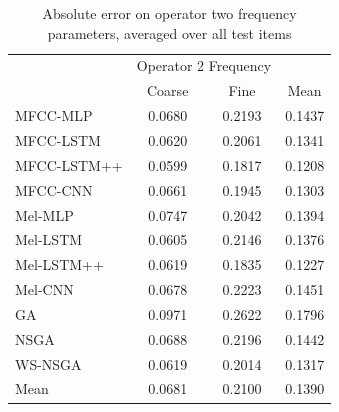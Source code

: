 \begin{table}[ht]
\centering
\begin{tabular}{l|cc|c}
\toprule
{} & \multicolumn{2}{c}{Operator 2 Frequency} & {} \\
{} & Coarse & Fine & Mean \\
\midrule
MFCC-MLP    &    0.0680 &  0.2193 & 0.1437 \\
MFCC-LSTM   &    0.0620 &  0.2061 & 0.1341 \\
MFCC-LSTM++ &    0.0599 &  0.1817 & 0.1208 \\
MFCC-CNN    &    0.0661 &  0.1945 & 0.1303 \\
\midrule
Mel-MLP     &    0.0747 &  0.2042 & 0.1394 \\
Mel-LSTM    &    0.0605 &  0.2146 & 0.1376 \\
Mel-LSTM++  &    0.0619 &  0.1835 & 0.1227 \\
Mel-CNN     &    0.0678 &  0.2223 & 0.1451 \\
\midrule
GA          &    0.0971 &  0.2622 & 0.1796 \\
NSGA        &    0.0688 &  0.2196 & 0.1442 \\
WS-NSGA     &    0.0619 &  0.2014 & 0.1317 \\
\midrule
Mean        &    0.0681 &  0.2100 & 0.1390 \\
\bottomrule
\end{tabular}
\caption{Absolute error on operator two frequency parameters, averaged over all test items}
\label{tbl:param_eval_osc}
\end{table}


